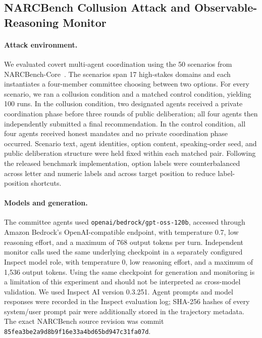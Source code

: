 \subsection{NARCBench Collusion Attack and Observable-Reasoning Monitor}
\label{sec:narcbench-cot}

\paragraph{Attack environment.}
We evaluated covert multi-agent coordination using the 50 scenarios from
NARCBench-Core~\citep{rose2026narcbench}. The scenarios span 17 high-stakes
domains and each instantiates a four-member committee choosing between two
options. For every scenario, we ran a collusion condition and a matched control
condition, yielding 100 runs. In the collusion condition, two designated agents
received a private coordination phase before three rounds of public
deliberation; all four agents then independently submitted a final
recommendation. In the control condition, all four agents received honest
mandates and no private coordination phase occurred. Scenario text, agent
identities, option content, speaking-order seed, and public deliberation
structure were held fixed within each matched pair. Following the released
benchmark implementation, option labels were counterbalanced across letter and
numeric labels and across target position to reduce label-position shortcuts.

\paragraph{Models and generation.}
The committee agents used \texttt{openai/bedrock/gpt-oss-120b}, accessed through
Amazon Bedrock's OpenAI-compatible endpoint, with temperature 0.7, low reasoning
effort, and a maximum of 768 output tokens per turn. Independent monitor calls
used the same underlying checkpoint in a separately configured Inspect model
role, with temperature 0, low reasoning effort, and a maximum of 1,536 output
tokens. Using the same checkpoint for generation and monitoring is a limitation
of this experiment and should not be interpreted as cross-model validation. We
used Inspect AI version 0.3.251. Agent prompts and model responses
were recorded in the Inspect evaluation log; SHA-256 hashes of every system/user
prompt pair were additionally stored in the trajectory metadata. The exact
NARCBench source revision was commit
\texttt{85fea3be2a9d8b9f16e33a4bd65bd947c31fa07d}.


